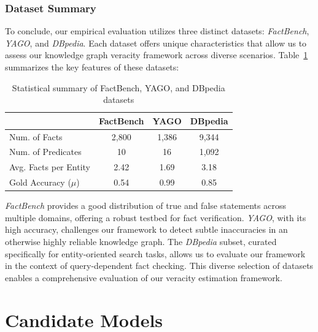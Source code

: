 \subsubsection{Dataset Summary}\label{subsubsec:empirical-evaluation:dataset-analysis:dbpedia:summary}
To conclude, our empirical evaluation utilizes three distinct datasets: \textit{FactBench}, \textit{YAGO}, and \textit{DBpedia}.
Each dataset offers unique characteristics that allow us to assess our knowledge graph veracity framework across diverse scenarios.
Table~\ref{tab:dataset-summary} summarizes the key features of these datasets:

\begin{table}[h!]
    \centering
    \caption{Statistical summary of FactBench, YAGO, and DBpedia datasets}
    \begin{tabular}{lccc}
        \toprule
        & \textbf{FactBench} & \textbf{YAGO} & \textbf{DBpedia} \\
        \midrule
        Num. of Facts & 2,800 & 1,386 & 9,344 \\
        Num. of Predicates & 10 & 16 & 1,092 \\
        Avg. Facts per Entity & 2.42 & 1.69 & 3.18 \\
        Gold Accuracy ($\mu$) & 0.54 & 0.99 & 0.85 \\
        \bottomrule
    \end{tabular}
    \label{tab:dataset-summary}
\end{table}

\textit{FactBench} provides a good distribution of true and false statements across multiple domains, offering a robust testbed for fact verification.
\textit{YAGO}, with its high accuracy, challenges our framework to detect subtle inaccuracies in an otherwise highly reliable knowledge graph.
The \textit{DBpedia} subset, curated specifically for entity-oriented search tasks, allows us to evaluate our framework in the context of query-dependent fact checking.
This diverse selection of datasets enables a comprehensive evaluation of our veracity estimation framework.

\section{Candidate Models}\label{sec:empirical-evaluation:candidate-models}
